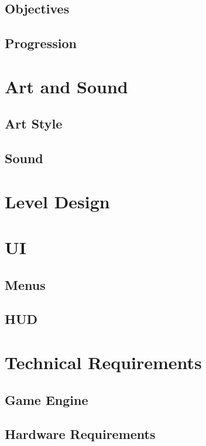 \documentclass[pdftex,12pt,a4paper,ngerman,dvipsnames]{scrreport}
\begin{document}
\section{Objectives}
\section{Progression}
\chapter{Art and Sound}
\section{Art Style}
\section{Sound}
\chapter{Level Design}
\chapter{UI}
\section{Menus}
\section{HUD}
\chapter{Technical Requirements}
\section{Game Engine}
\section{Hardware Requirements}
\end{document}
